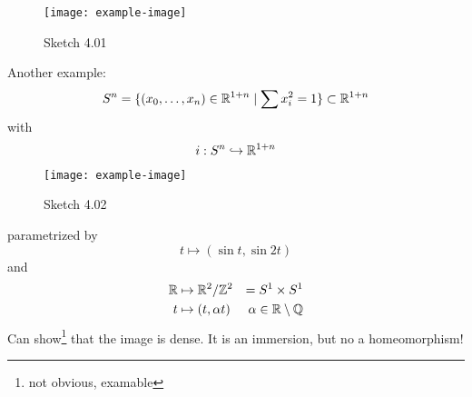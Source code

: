 \begin{example}
    \begin{figure}[H]
        \centering
        \texttt{[image: example-image]}
        \caption{Sketch 4.01}
    \end{figure}
    Another example: \[S^n=\{(x_0,\dots,x_n)\in\mathbb{R}^{1+n}\mid\sum x_i^2=1\}\subset\mathbb{R}^{1+n}\]
    with \[i:S^n\hookrightarrow \mathbb{R}^{1+n}\]

    \begin{figure}[H]
        \centering
        \texttt{[image: example-image]}
        \caption{Sketch 4.02}
    \end{figure}
    parametrized by \[t\mapsto (\sin t,\sin 2t)\]
    and 
    \begin{align*}
        \mathbb{R}&\mapsto \mathbb{R}^2/\mathbb{Z}^2&=S^1\times S^1\\
        t&\mapsto (t,\alpha t) & \alpha \in\mathbb{R}\setminus \mathbb{Q} 
    \end{align*}
    Can show\footnote{not obvious, examable} that the image is dense. It is an immersion, but no a homeomorphism!
\end{example}








